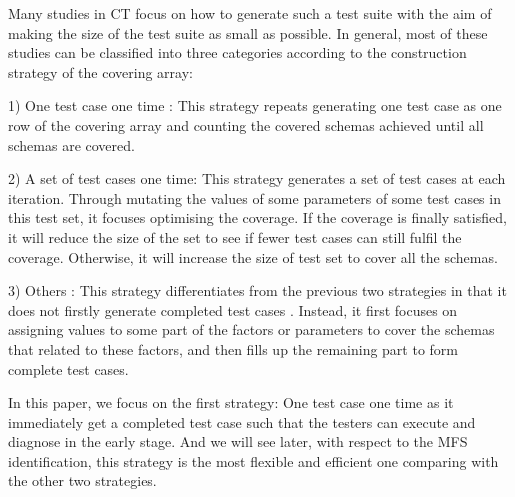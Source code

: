 \documentclass{sig-alternate}
\begin{document}
Many studies in CT focus on how to generate such a test suite with the aim of making the size of the test suite as small as possible. In general, most of these studies can be classified into three categories according to the construction strategy of the covering array:

1) One test case one time : This strategy repeats generating one test case as one row of the covering array and counting the covered schemas achieved until all schemas are covered.


2) A  set of test cases one time:  This strategy generates a set of test cases at each iteration. Through mutating the values of some parameters of some test cases in this test set, it focuses optimising the coverage. If the coverage is finally satisfied, it will reduce the size of the set to see if fewer test cases can still fulfil the coverage. Otherwise, it will increase the size of test set to cover all the schemas\cite{cohen2003augmenting}.

3) Others :  This strategy differentiates from the previous two strategies in that it does not firstly generate completed test cases \cite{lei2008ipog}. Instead, it first focuses on assigning values to some part of the factors or parameters to cover the schemas that related to these factors, and then fills up the remaining part to form complete test cases.

In this paper, we focus on the first strategy: One test case one time as it immediately get a completed test case such that the testers can execute and diagnose in the early stage. And we will see later, with respect to the MFS identification, this strategy is the most flexible and efficient one comparing with the other two strategies.

%

%
%
%

\end{document}
